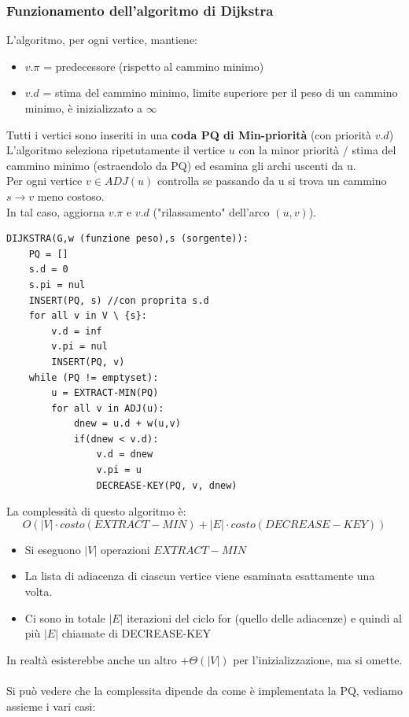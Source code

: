 \documentclass[a4paper,12pt]{article}
\begin{document}
\subsubsection{Funzionamento dell'algoritmo di Dijkstra}
L'algoritmo, per ogni vertice, mantiene:
\begin{itemize}
    \item $v.\pi$ = predecessore (rispetto al cammino minimo)
    \item $v.d$ = stima del cammino minimo, limite superiore per il peso di un cammino minimo, è inizializzato a $\infty$
\end{itemize}
Tutti i vertici sono inseriti in una \textbf{coda PQ di Min-priorità} (con priorità $v.d$)\\
L'algoritmo seleziona ripetutamente il vertice $u$ con la minor priorità / stima del cammino minimo (estraendolo da PQ) ed esamina gli archi uscenti da u.\\
Per ogni vertice $v \in ADJ(u)$ controlla se passando da u si trova un cammino $s \to v$ meno costoso.\\
In tal caso, aggiorna $v.\pi$ e $v.d$ ("rilassamento" dell'arco $(u,v)$).
\begin{lstlisting}
DIJKSTRA(G,w (funzione peso),s (sorgente)):
    PQ = []
    s.d = 0
    s.pi = nul
    INSERT(PQ, s) //con proprita s.d
    for all v in V \ {s}:
        v.d = inf
        v.pi = nul
        INSERT(PQ, v)
    while (PQ != emptyset):
        u = EXTRACT-MIN(PQ)
        for all v in ADJ(u):
            dnew = u.d + w(u,v)
            if(dnew < v.d):
                v.d = dnew
                v.pi = u
                DECREASE-KEY(PQ, v, dnew)

\end{lstlisting}
La complessità di questo algoritmo è:
\[
O(|V| \cdot costo(EXTRACT-MIN) + |E| \cdot costo(DECREASE-KEY))
\]
\begin{itemize}
    \item Si eseguono $|V|$ operazioni $EXTRACT-MIN$
    \item La lista di adiacenza di ciascun vertice viene esaminata esattamente una volta.
    \item Ci sono in totale $|E|$ iterazioni del ciclo for (quello delle adiacenze) e quindi al più $|E|$ chiamate di DECREASE-KEY
\end{itemize}
In realtà esisterebbe anche un altro $+ \Theta(|V|)$ per l'inizializzazione, ma si omette.\\\\
Si può vedere che la complessita dipende da come è implementata la PQ, vediamo assieme i vari casi:
\end{document}
